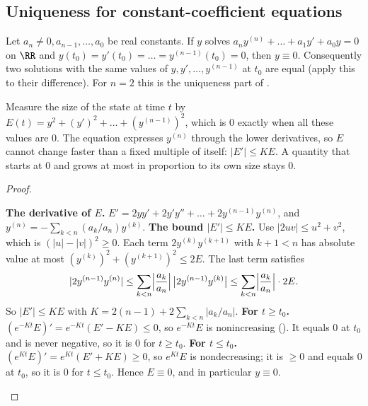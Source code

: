 \documentclass[10pt]{scrartcl}
\begin{document}
\subsection{Uniqueness for constant-coefficient equations}
\begin{proposition*}
  Let $a_n\neq 0,a_{n-1},\dots,a_0$ be real constants. If $y$ solves $a_ny^{(n)}+\dots+a_1y'+a_0y=0$ on $\RR$ and $y(t_0)=y'(t_0)=\dots=y^{(n-1)}(t_0)=0$, then $y\equiv 0$. Consequently two solutions with the same values of $y,y',\dots,y^{(n-1)}$ at $t_0$ are equal (apply this to their difference). For $n=2$ this is the uniqueness part of .
\end{proposition*}
\begin{ideabox}
  Measure the size of the state at time $t$ by $E(t)=y^2+(y')^2+\dots+(y^{(n-1)})^2$, which is $0$ exactly when all these values are $0$. The equation expresses $y^{(n)}$ through the lower derivatives, so $E$ cannot change faster than a fixed multiple of itself: $|E'|\le KE$. A quantity that starts at $0$ and grows at most in proportion to its own size stays $0$.
\end{ideabox}
\begin{proof}
  \begin{steps}
    \ii \textbf{The derivative of $E$.} $E'=2yy'+2y'y''+\dots+2y^{(n-1)}y^{(n)}$, and $y^{(n)}=-\sum_{k<n}(a_k/a_n)y^{(k)}$.
    \ii \textbf{The bound $|E'|\le KE$.} Use $|2uv|\le u^2+v^2$, which is $(|u|-|v|)^2\ge 0$. Each term $2y^{(k)}y^{(k+1)}$ with $k+1<n$ has absolute value at most $(y^{(k)})^2+(y^{(k+1)})^2\le 2E$. The last term satisfies
    \[
      |2y^{(n-1)}y^{(n)}|\le\sum_{k<n}\Bigl|\frac{a_k}{a_n}\Bigr|\,\bigl|2y^{(n-1)}y^{(k)}\bigr|\le\sum_{k<n}\Bigl|\frac{a_k}{a_n}\Bigr|\cdot 2E.
    \]
    So $|E'|\le KE$ with $K=2(n-1)+2\sum_{k<n}|a_k/a_n|$.
    \ii \textbf{For $t\ge t_0$.} $(e^{-Kt}E)'=e^{-Kt}(E'-KE)\le 0$, so $e^{-Kt}E$ is nonincreasing (). It equals $0$ at $t_0$ and is never negative, so it is $0$ for $t\ge t_0$.
    \ii \textbf{For $t\le t_0$.} $(e^{Kt}E)'=e^{Kt}(E'+KE)\ge 0$, so $e^{Kt}E$ is nondecreasing; it is $\ge 0$ and equals $0$ at $t_0$, so it is $0$ for $t\le t_0$.
    \ii Hence $E\equiv 0$, and in particular $y\equiv 0$. \qedhere
  \end{steps}
\end{proof}
\end{document}
